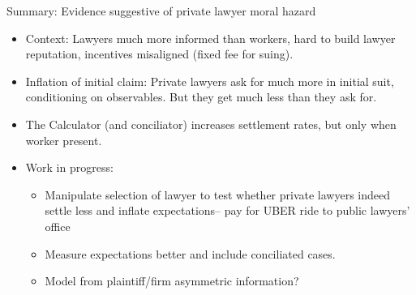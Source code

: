 \documentclass[9pt]{beamer}
\begin{document}
\begin{frame}{Summary: Evidence suggestive of private lawyer moral hazard}
  \begin{itemize}
  \item \alert{Context:} Lawyers much more informed than workers, hard to build lawyer reputation, incentives misaligned (fixed fee for suing).
    \vspace{0.05in}
  \item \alert{Inflation of initial claim:} Private lawyers ask for much more in initial suit, conditioning on observables. But they get much less than they ask for. 
    \vspace{0.05in}
  \item  The Calculator (and conciliator) increases settlement rates, but \alert{only when worker present}.
    \vspace{0.05in}
  \item Work in progress:
  \vspace{0.05in}
    \begin{itemize}
    \item \alert{Manipulate selection of lawyer} to test whether private lawyers indeed settle less and inflate expectations-- pay for UBER ride to public lawyers' office
      \vspace{0.05in}
    \item Measure expectations better and include conciliated cases.
      \vspace{0.05in}
    \item Model from plaintiff/firm asymmetric information?
      \vspace{0.05in} 
    \end{itemize}
\end{itemize}
\end{frame}
\end{document}
